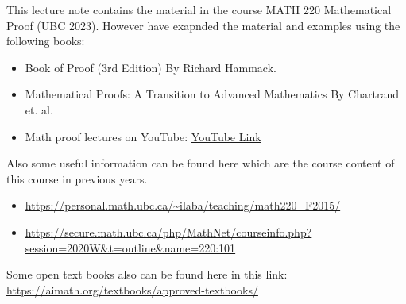\documentclass[10pt]{article}
\begin{document}

This lecture note contains the material in the course MATH 220 Mathematical Proof (UBC 2023). However have exapnded the material and examples using the following books:

\begin{itemize}
	\item Book of Proof (3rd Edition) By Richard Hammack.
	\item Mathematical Proofs: A Transition to Advanced Mathematics By Chartrand et. al.
	\item Math proof lectures on YouTube: \href{https://www.youtube.com/watch?v=UuETUEJo0rk&list=PL2419488168AE7001&index=1}{YouTube Link} 
\end{itemize}

Also some useful information can be found here which are the course content of this course in previous years.
\begin{itemize}
	\item \url{https://personal.math.ubc.ca/~ilaba/teaching/math220_F2015/}
	\item \url{https://secure.math.ubc.ca/php/MathNet/courseinfo.php?session=2020W&t=outline&name=220:101}
\end{itemize}


Some open text books also can be found here in this link: \url{https://aimath.org/textbooks/approved-textbooks/}

\newpage

\end{document}
